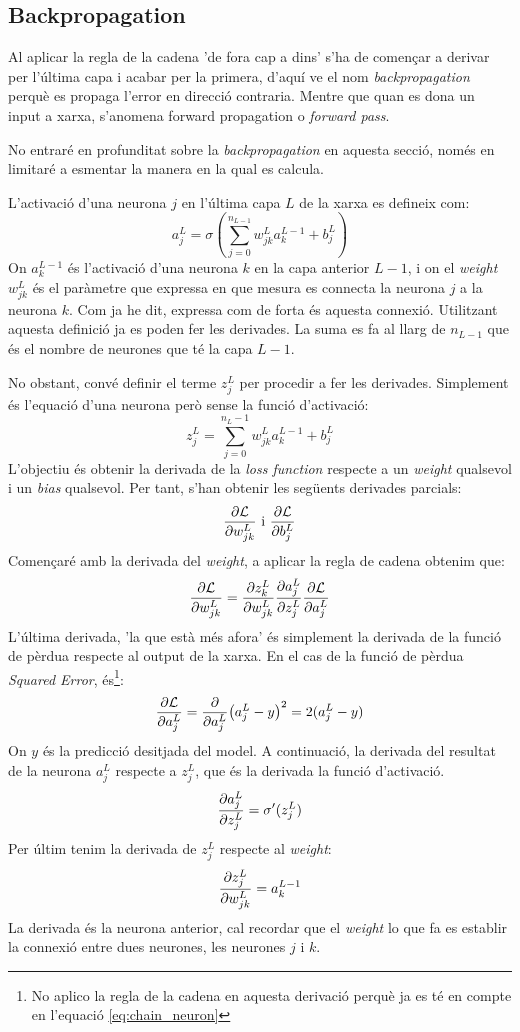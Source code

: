 \subsection{Backpropagation}
Al aplicar la regla de la cadena 'de fora cap a dins' s'ha de començar a derivar per l'última capa i acabar per la primera, d'aquí ve el nom \textit{backpropagation} perquè es propaga l'error en direcció contraria. Mentre que quan es dona un input a xarxa, s'anomena {forward propagation} o \textit{forward pass}.  

No entraré en profunditat sobre la \textit{backpropagation} en aquesta secció, només en limitaré a esmentar la manera en la qual es calcula. 

L'activació d'una neurona $j$ en l'última capa $L$ de la xarxa es defineix com: 
$$
a^{L}_j = \sigma\left(\sum_{j=0}^{n_{L- 1}}w^L_{jk} a^{L-1}_k+ b_j^L\right)
$$
On $a^{L-1}_k$ és l'activació d'una neurona $k$ en la capa anterior $L-1$, i on el \textit{weight} $w^L_{jk}$ és el paràmetre que expressa en que mesura es connecta la neurona $j$ a la neurona $k$. Com ja he dit, expressa com de forta és aquesta connexió. Utilitzant aquesta definició ja es poden fer les derivades. La suma es fa al llarg de $n_{L-1}$ que és el nombre de neurones que té la capa $L-1$.

No obstant, convé definir el terme $z_j^L$ per procedir a fer les derivades. Simplement és l'equació d'una neurona però sense la funció d'activació:
$$
z_j^L = \sum_{j=0}^{n_L - 1}w^L_{jk} a^{L-1}_k+ b_j^L
$$
L'objectiu és obtenir la derivada de la \textit{loss function} respecte a un \textit{weight} qualsevol i un \textit{bias} qualsevol. Per tant, s'han obtenir les següents derivades parcials:
$$
\pdv{\mathcal{L}}{w_{jk}^L} \text{ i } \pdv{\mathcal{L}}{b_j^L}
$$
Començaré amb la derivada del \textit{weight}, a aplicar la regla de cadena obtenim que:
\begin{equation}
	\pdv{\mathcal{L}}{w_{jk}^L} = \pdv{z_k^L}{w_{jk}^L}\pdv{a_j^L}{z_j^L}\pdv{\mathcal{L}}{a_j^L}
	\label{eq:chain_neuron}
\end{equation}
L'última derivada, 'la que està més afora' és simplement la derivada de la funció de pèrdua respecte al output de la xarxa. En el cas de la funció de pèrdua \textit{Squared Error}, és\footnote{No aplico la regla de la cadena en aquesta derivació perquè ja es té en compte en l'equació \ref{eq:chain_neuron}}:
$$
\pdv{\mathcal{L}}{a_j^L} =  \pdv{a_j^L} (a_j^L - y)^2 = 2(a_j^L - y)
$$
On $y$ és la predicció desitjada del model. A continuació, la derivada del resultat de la neurona $a_j^L$ respecte a $z_j^L$, que és la derivada la funció d'activació.
$$
\pdv{a_j^L}{z_j^L} = \sigma'(z_j^L)
$$
Per últim tenim la derivada de $z_j^L$ respecte al \textit{weight}:
$$
\pdv{z_j^L}{w_{jk}^L} = a^{L-1}_k
$$
La derivada és la neurona anterior, cal recordar que el \textit{weight} lo que fa es establir la connexió entre dues neurones, les neurones $j$ i $k$. 


